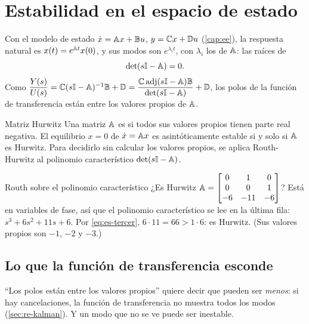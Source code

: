 \section{Estabilidad en el espacio de estado}
\label{sec:es-espacio}

Con el modelo de estado $\dot x=\mathbb{A} x+\mathbb{B} u$, $y=\mathbb{C} x+\mathbb{D} u$ (\cref{cap:ee}), la respuesta natural es $x(t)=e^{\mathbb{A} t}x(0)$, y sus modos son $e^{\lambda_it}$, con $\lambda_i$ los  de $\mathbb{A}$: las raíces de
\[
  \det(s\mathbb{I}-\mathbb{A})=0 .
\]
Como $\dfrac{Y(s)}{U(s)}=\mathbb{C}(s\mathbb{I}-\mathbb{A})^{-1}\mathbb{B}+\mathbb{D}=\dfrac{\mathbb{C}\operatorname{adj}(s\mathbb{I}-\mathbb{A})\mathbb{B}}{\det(s\mathbb{I}-\mathbb{A})}+\mathbb{D}$, los polos de la función de transferencia están entre los valores propios de $\mathbb{A}$.

\begin{definicion}[label=def:es-hurwitz]{Matriz Hurwitz}
Una matriz $\mathbb{A}$ es  si todos sus valores propios tienen parte real negativa. El equilibrio $x=0$ de $\dot x=\mathbb{A} x$ es asintóticamente estable si y solo si $\mathbb{A}$ es Hurwitz. Para decidirlo sin calcular los valores propios, se aplica Routh-Hurwitz al polinomio característico $\det(s\mathbb{I}-\mathbb{A})$.
\end{definicion}

\begin{ejemplo}[label=ej:es-matriz]{Routh sobre el polinomio característico}
¿Es Hurwitz $\mathbb{A}=\begin{bmatrix}0&1&0\\0&0&1\\-6&-11&-6\end{bmatrix}$?
\solucion Está en variables de fase, así que el polinomio característico se lee en la última fila: $s^3+6s^2+11s+6$. Por \eqref{eq:es-tercer}, $6\cdot11=66>1\cdot6$: es Hurwitz. (Sus valores propios son $-1$, $-2$ y $-3$.)
\end{ejemplo}

\subsection*{Lo que la función de transferencia esconde}

``Los polos están entre los valores propios'' quiere decir que pueden ser \emph{menos}: si hay cancelaciones, la función de transferencia no muestra todos los modos (\cref{sec:re-kalman}). Y un modo que no se ve puede ser inestable.

